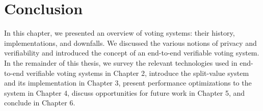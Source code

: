 \section{Conclusion} \label{intro:conclusion}

In this chapter, we presented an overview of voting systems: their history, implementations, and downfalls. We discussed the various notions of privacy and verifiability and introduced the concept of an end-to-end verifiable voting system. In the remainder of this thesis, we survey the relevant technologies used in end-to-end verifiable voting systems in Chapter 2, introduce the split-value system and its implementation in Chapter 3, present performance optimizations to the system in Chapter 4, discuss opportunities for future work in Chapter 5, and conclude in Chapter 6.
